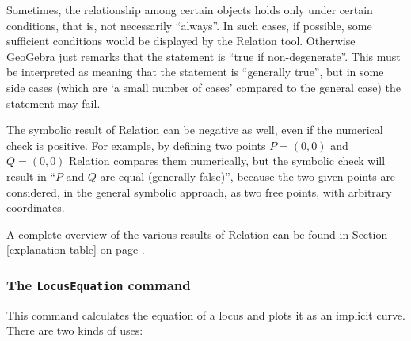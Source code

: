 \documentclass{article}
\begin{document}
Sometimes, the relationship among certain objects holds only under certain conditions, that is, not necessarily ``always''. In such cases, if possible, some sufficient conditions would be displayed by the Relation tool. Otherwise GeoGebra just remarks that the statement is ``true if non-degenerate''. This must be interpreted as meaning that the statement is ``generally true'', but in some side cases (which are `a small number of cases' compared to the general case) the statement may fail.

The symbolic result of Relation can be negative as well, even if the numerical check is positive. For example, by defining two points $P=(0,0)$ and $Q=(0,0)$ Relation compares them numerically, but the symbolic check will result in ``$P$ and $Q$ are equal (generally false)'', because the two given points are considered, in the general symbolic approach, as two free points, with arbitrary coordinates.

A complete overview of the various results of Relation can be found in Section \ref{explanation-table} on page \pageref{explanation-table}.

\subsubsection{The \texttt{LocusEquation} command}

This command calculates the equation of a locus and plots it as an implicit curve. There are two kinds of uses:
\end{document}
